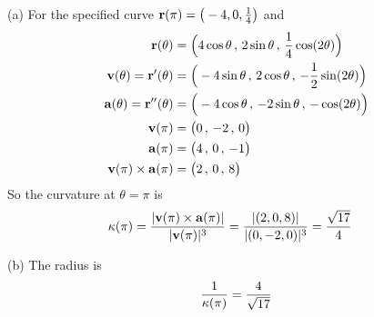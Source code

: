 \begin{solution} (a) 
	For the specified curve $\mathbf{r}(\pi) = \big(-4,0,\frac{1}{4}\big)$ and
	\begin{align*}
	\mathbf{r}(\theta) &= \Big(4 \cos\theta\,,\, 2\sin\theta\,,\, 
	\frac{1}{4}\cos(2\theta)\Big) \\
	\mathbf{v}(\theta)=\mathbf{r}'(\theta) &= \Big(-4 \sin\theta\,,\, 2\cos\theta\,,\, 
	-\frac{1}{2}\sin(2\theta)\Big) \\
	\mathbf{a}(\theta) = \mathbf{r}''(\theta) &= \Big(-4 \cos\theta\,,\, -2\sin\theta\,,\, 
	-\cos(2\theta)\Big) \\
	\mathbf{v}(\pi) &= \big(0\,,\, -2\,,\, 0\big) \\
	\mathbf{a}(\pi) &= \big(4\,,\, 0\,,\, -1\big) \\
	\mathbf{v}(\pi) \times \mathbf{a}(\pi) &= \big(2\,,\, 0\,,\, 8\big) 
	\end{align*}
	So the curvature at $\theta=\pi$ is
	\begin{align*}
	\kappa(\pi)&=\frac{|\mathbf{v}(\pi) \times \mathbf{a}(\pi)|}{|\mathbf{v}(\pi)|^3}
	=\frac{|(2,0,8)|}{|(0,-2,0)|^3}
	=\frac{\sqrt{17}}{4}
	\end{align*}
	
	(b) The radius is
	\begin{equation*}
	\frac{1}{\kappa(\pi)} = \frac{4}{\sqrt{17}}
	\end{equation*}
	

\end{solution}
